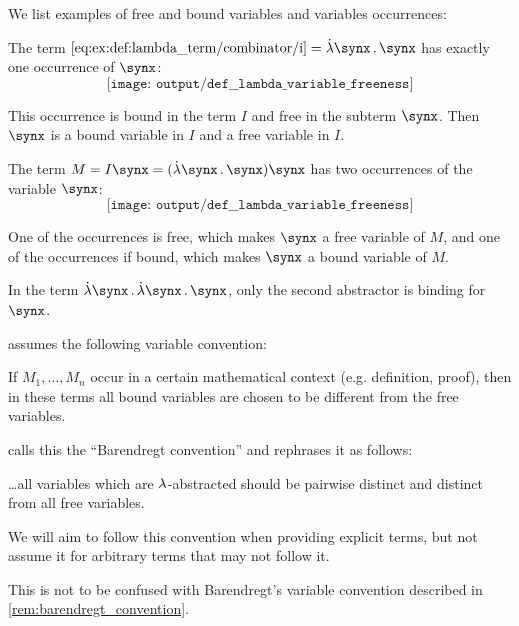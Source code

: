 \begin{example}\label{ex:def:lambda_variable_freeness}
  We list examples of free and bound variables and variables occurrences:
  \begin{thmenum}
     The term \( \ref{eq:ex:def:lambda_term/combinator/i} = \qabs \synx \synx \) has exactly one occurrence of \( \synx \):
    \begin{equation*}
      \texttt{[image: output/def\_\_lambda\_variable\_freeness]}
    \end{equation*}

     This occurrence is bound in the term \( I \) and free in the subterm \( \synx \). Then \( \synx \) is a bound variable in \( I \) and a free variable in \( I \).

     The term \( M = I \synx = (\qabs \synx \synx) \synx \) has two occurrences of the variable \( \synx \):
    \begin{equation*}
      \texttt{[image: output/def\_\_lambda\_variable\_freeness]}
    \end{equation*}

    One of the occurrences is free, which makes \( \synx \) a free variable of \( M \), and one of the occurrences if bound, which makes \( \synx \) a bound variable of \( M \).

     In the term \( \qabs \synx \qabs \synx \synx \), only the second abstractor is binding for \( \synx \).
  \end{thmenum}
\end{example}

\begin{remark}\label{rem:barendregt_variable_convention}
   assumes the following variable convention:
  \begin{displayquote}
    If \( M_1, \ldots, M_n \) occur in a certain mathematical context (e.g. definition, proof), then in these terms all bound variables are chosen to be different from the free variables.
  \end{displayquote}

   calls this the \enquote{Barendregt convention} and rephrases it as follows:
  \begin{displayquote}
    \ldots all variables which are \( {\mathrm \lambda} \)-abstracted should be pairwise distinct and distinct from all free variables.
  \end{displayquote}

  We will aim to follow this convention when providing explicit terms, but not assume it for arbitrary terms that may not follow it.
\end{remark}
\begin{comments}
  \item This is not to be confused with Barendregt's variable convention described in \cref{rem:barendregt_convention}.
\end{comments}

